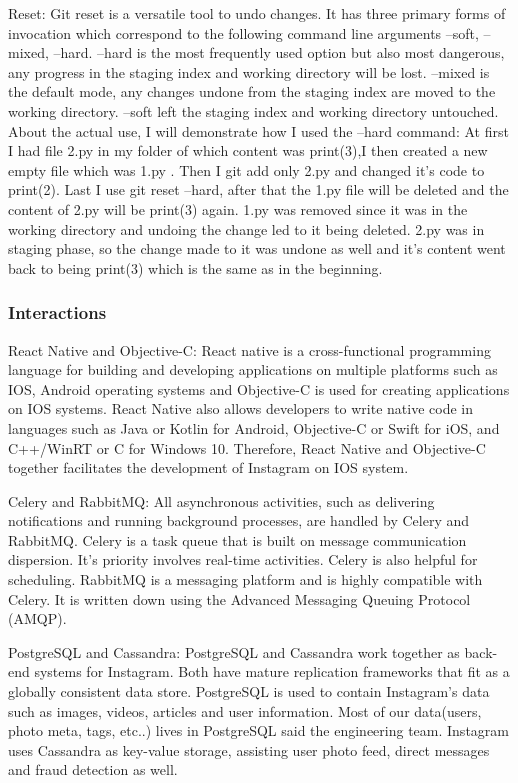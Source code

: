 \documentclass[a4paper, 11pt]{report}
\begin{document}
Reset: Git reset is a versatile tool to undo changes. It has three primary forms of invocation which correspond to the following command line arguments --soft, --mixed, --hard. --hard is the most frequently used option but also most dangerous, any progress in the staging index and working directory will be lost. --mixed is the default mode, any changes undone from the staging index  are moved to  the working directory. --soft left the staging index and working directory untouched.
About the actual use, I will demonstrate how I used the –hard command: At first I had file 2.py in my folder of which content was print(3),I then created a new empty file which was 1.py . Then I git add only 2.py and changed it's code to print(2). Last I use git reset –hard, after that the 1.py file will be deleted and the content of 2.py will be print(3) again.
1.py was removed since it was in the working directory and undoing the change led to it being deleted. 2.py was in staging phase, so the change made to it was undone as well and it’s content went back to being print(3) which is the same as in the beginning.

\subsubsection{ Interactions}
React Native and Objective-C: React native is a cross-functional programming language for building and developing applications on multiple platforms such as IOS, Android operating 
systems and Objective-C is used for creating applications on IOS systems. React Native also allows developers to write native code in languages such as Java or Kotlin for Android, Objective-C or Swift for iOS, and C++/WinRT or C for Windows 10. Therefore, React Native and Objective-C together facilitates the development of Instagram on IOS system.

 Celery and RabbitMQ: All asynchronous activities, such as delivering notifications and running background processes, are handled by Celery and RabbitMQ. Celery is a task queue that is built on message communication dispersion. It's priority involves real-time activities. Celery is also helpful for scheduling. RabbitMQ is a messaging platform and is highly compatible with Celery. It is written down using the Advanced Messaging Queuing Protocol (AMQP).

PostgreSQL and Cassandra: PostgreSQL and Cassandra work together as back-end systems for Instagram. Both have mature replication frameworks that fit as a globally consistent data store. PostgreSQL is used to contain Instagram's data such as images, videos, articles and user information. Most of our data(users, photo meta, tags, etc..) lives in PostgreSQL said the engineering team. Instagram uses Cassandra as key-value storage, assisting user photo feed, direct messages and fraud detection as well.
\end{document}
